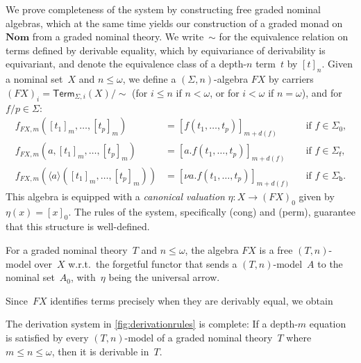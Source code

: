 \documentclass[a4paper,UKenglish,cleveref,thm-restate,numberwithinsect,final]{lipics-v2021}
\newcommand{\Term}{\mathsf{Term}}
\newcommand{\sig}{\Sigma}
\newcommand{\sigp}{\Sigma_0}
\newcommand{\sigf}{\Sigma_{\mathsf f}}
\newcommand{\sigb}{\Sigma_{\mathsf b}}
\newcommand{\bind}[1]{\langle #1\rangle}
\theoremstyle{plain}
\numberwithin{equation}{section}
\newcommand{\+}[1]{\mathcal{#1}\xspace}
\newcommand{\Nom}{\mathbf{Nom}}
\theoremstyle{definition}
\begin{document}
\noindent We prove completeness of the system by constructing free
graded nominal algebras, which at the same time yields our
construction of a graded monad on $\Nom$ from a graded nominal
theory. We write~$\sim$ for the equivalence relation on terms defined
by derivable equality, which by equivariance of derivability
is equivariant, and denote
the equivalence class of a depth-$n$ term~$t$ by $[t]_n$. Given a
nominal set~$X$ and $n\le\omega$, we define a $(\Sigma,n)$-algebra
$FX$ by carriers $(FX)_i = \Term_{\sig, i}(X)/{\sim}$ (for $i \le n$
if $n<\omega$, or for $i<\omega$ if $n=\omega$), and for
$f/p \in \Sigma$:
\begin{align*}
  f_{FX, m}([t_1]_m, \ldots, [t_p]_m) &= [f(t_1, \ldots, t_p)]_{m + d(f)} && \text{if $f \in \sigp$,} \\
  f_{FX, m}(a, [t_1]_m, \ldots, [t_p]_m) &= [a.f(t_1, \ldots, t_p)]_{m + d(f)} && \text{if $f \in \sigf$,} \\
  f_{FX, m}(\bind{a} ([t_1]_m, \ldots, [t_p]_m)) &= [\nu a.f(t_1, \ldots, t_p)]_{m + d(f)} && \text{if $f \in \sigb$.}
\end{align*}
This algebra is equipped with a \emph{canonical valuation}
$\eta\colon X\to (FX)_0$ given by $\eta(x)=[x]_0$. The rules of the
system, specifically (cong) and (perm), guarantee that this structure
is well-defined.
\begin{theorem}\label{thm:free}
  For a graded nominal theory~$T$ and $n\le\omega$, the algebra $FX$
  is a free $(T,n)$-model over~$X$ w.r.t.\ the forgetful functor that
  sends a $(T,n)$-model~$A$ to the nominal set~$A_0$, with~$\eta$
  being the universal arrow.
\end{theorem}
\noindent Since~$FX$ identifies terms precisely when they are derivably
equal, we obtain
\begin{corollary}[Completeness]
  The derivation system in \cref{fig:derivationrules} is complete:
  If a depth-$m$ equation is satisfied by every \((T, n)\)-model of a
  graded nominal theory~$T$ where $m\le n\le\omega$, then it is
  derivable in~$T$.
\end{corollary}
\end{document}
